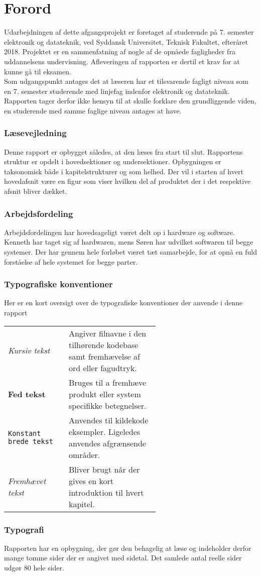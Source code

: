 \chapter*{Forord}\label{chap:forord}

Udarbejdningen af dette afgangsprojekt er foretaget af studerende på 7. semester elektronik og datateknik, ved Syddansk Universitet, Teknisk Fakultet, efteråret 2018. Projektet er en sammenfatning af nogle af de opnåede fagligheder fra uddannelsens undervisning. Afleveringen af rapporten er dertil et krav for at kunne gå til eksamen.\\

Som udgangspunkt antages det at læseren har et tilsvarende fagligt niveau som en 7. semester studerende med linjefag indenfor elektronik og datateknik.
Rapporten tager derfor ikke hensyn til at skulle forklare den grundliggende viden, en studerende med samme faglige niveau antages at have.

\subsection{Læsevejledning}
Denne rapport er opbygget således, at den læses fra start til slut. Rapportens struktur er opdelt i hovedsektioner og undersektioner. Opbygningen er taksonomisk både i kapitelstrukturer og som helhed. Der vil i starten af hvert hovedafsnit være en figur som viser hvilken del af produktet der i det respektive afsnit bliver dækket.

\subsection{Arbejdsfordeling}
Arbejdsfordelingen har hovedsageligt været delt op i hardware og software. Kenneth har taget sig af hardwaren, mens Søren har udvilket softwaren til begge systemer. Der har gennem hele forløbet været tæt samarbejde, for at opnå en fuld forståelse af hele systemet for begge parter. 

\subsection{Typografiske konventioner}
Her er en kort oversigt over de typografiske konventioner der anvende i denne rapport\\
\begin{tabular}{l p{0.6\linewidth}}
	\textit{Kursiv tekst}			& Angiver filnavne i den tilhørende kodebase samt fremhævelse af ord eller fagudtryk. \\
	\textbf{Fed tekst}				& Bruges til a fremhæve produkt eller system specifikke betegnelser.\\
	\texttt{Konstant brede tekst}	& Anvendes til kildekode eksempler. Ligeledes anvendes afgrænsende områder.\\
	\emph{Fremhævet tekst}		    & Bliver brugt når der gives en kort introduktion til hvert kapitel.\\
\end{tabular}

\subsection{Typografi}
Rapporten har en opbygning, der gør den behagelig at læse og indeholder derfor mange tomme sider der er angivet med sidetal.
Det samlede antal reelle sider udgør 80 hele sider. 
